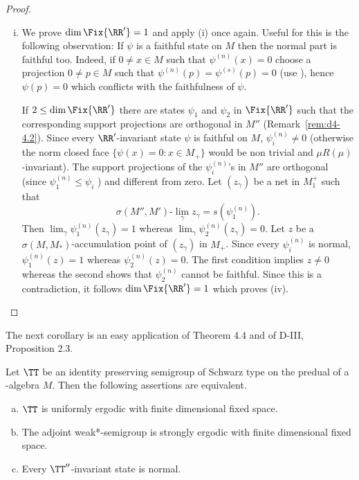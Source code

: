 \begin{proof}
\begin{enumerate}[(i), wide]
\item
We prove $ \dim \Fix{\RR'} = 1 $  and apply (i) once again.
Useful for this is the following observation: If $ \psi $  is a faithful state on $ M $  then the normal part is faithful too.
Indeed, if $ 0 \neq x \in M $  such that $ \psi^{(n)}(x) = 0 $  choose a projection $ 0 \neq p \in M $  such that $ \psi^{(n)}(p) = \psi^{(s)}(p) = 0 $  (use \citet[Theorem III.3.8]{takesaki:1979}), hence $ \psi(p) = 0 $  which conflicts with the faithfulness of $ \psi $.

If $ 2 \leq \dim \Fix{\RR'} $  there are states $ \psi_{1} $  and $ \psi_{2} $  in $ \Fix{\RR'} $  such that the corresponding support projections are orthogonal in $ M'' $  (Remark~\ref{rem:d4-4.2}).
Since every $ \RR' $-invariant state $ \psi $  is faithful on $ M $, $ \psi_{i}^{(n)} \neq 0 $  (otherwise the norm closed face $ \{\psi(x) = 0: x \in M_{+}\} $  would
be non trivial and $ \mu R(\mu) $-invariant).
The support projections of the $ \psi_{i}^{(n)} $'s in $ M'' $  are orthogonal (since $ \psi_{1}^{(n)} \leq \psi_{i} $ ) and different from zero.
Let $ (z_{\gamma}) $  be a net in $ M_{1}^{+} $  such that
\[
\sigma(M'',M')\text{-}\lim_{\gamma} z_{\gamma} = s(\psi_{1}^{(n)}).
\]
Then $ \lim_{\gamma} \psi_{1}^{(n)}(z_{\gamma}) = 1 $  whereas $ \lim_{\gamma} \psi_{2}^{(n)}(z_{\gamma}) = 0 $.
Let $ z $  be a $ \sigma(M,M_{*}) $-accumulation point of $ (z_{\gamma}) $  in $ M_{+} $.
Since every $ \psi_{i}^{(n)} $  is normal, $ \psi_{1}^{(n)}(z) = 1 $  whereas $ \psi_{2}^{(n)}(z) = 0 $.
The first condition implies $ z \neq 0 $  whereas the second shows that $ \psi_{2}^{(n)} $  cannot be faithful.
Since this is a contradiction, it follows $ \dim \Fix{\RR'} = 1 $  which proves (iv).
\end{enumerate}
\end{proof}
The next corollary is an easy application of Theorem 4.4 and of D-III, Proposition 2.3.
\begin{corollary}\label{cor:d4-4.5}
Let $ \TT $  be an identity preserving semigroup of Schwarz type on the predual of a \WA-algebra $ M $.
Then the following assertions are equivalent.
\begin{enumerate}[(a)]
\item
$ \TT $  is uniformly ergodic with finite dimensional fixed space.

\item
The adjoint weak*-semigroup is strongly ergodic with finite dimensional fixed space.

\item
Every $ \TT'' $-invariant state is normal.
\end{enumerate}
\end{corollary}

